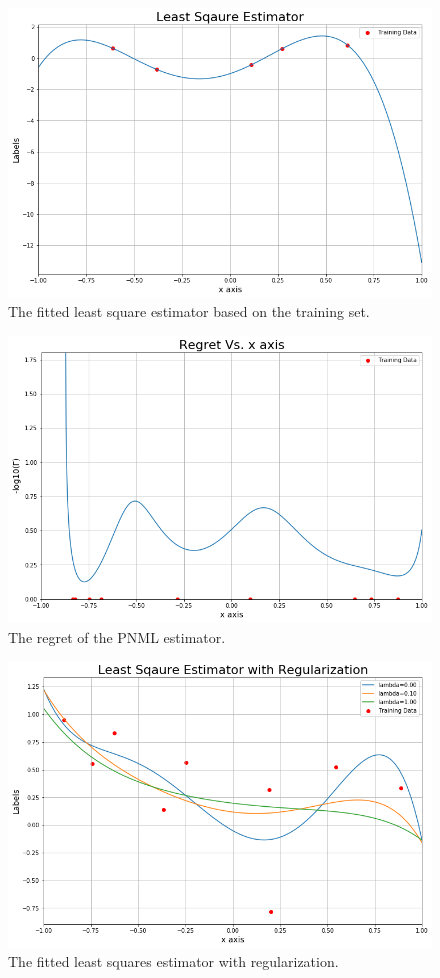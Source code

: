 \documentclass[final,1p,times]{elsarticle}
\begin{document}
\begin{figure}[h] 
\centering\includegraphics[width=0.6\linewidth]{least_sqaures_plot.png}
\caption{The fitted least square estimator based on the training set.}
\label{fig:least_sqaures}
\end{figure}

\begin{figure}[h]
\centering\includegraphics[width=0.6\linewidth]{regret_plot.png}
\caption{The regret of the PNML estimator.}
\label{fig:regret}
\end{figure}

\begin{figure}[h] 
\centering\includegraphics[width=0.6\linewidth]{least_sqaure_with_reg_plot.png}
\caption{The fitted least squares estimator with regularization.}
\label{fig:least_sqaures_with_reg}
\end{figure}
\end{document}
